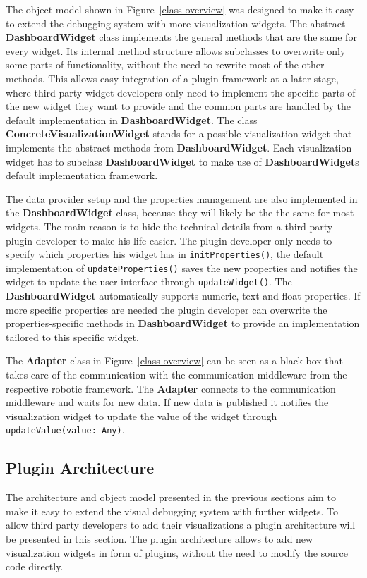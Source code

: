 The object model shown in Figure~\ref{class overview} was designed to make it easy to extend the debugging system with more visualization widgets. The abstract \textbf{DashboardWidget} class implements the general methods that are the same for every widget. Its internal method structure allows subclasses to overwrite only some parts of functionality, without the need to rewrite most of the other methods. This allows easy integration of a plugin framework at a later stage, where third party widget developers only need to implement the specific parts of the new widget they want to provide and the common parts are handled by the default implementation in \textbf{DashboardWidget}. The class \textbf{ConcreteVisualizationWidget} stands for a possible visualization widget that implements the abstract methods from \textbf{DashboardWidget}. Each visualization widget has to subclass \textbf{DashboardWidget} to make use of \textbf{DashboardWidget}s default implementation framework.

The data provider setup and the properties management are also implemented in the \textbf{DashboardWidget} class, because they will likely be the the same for most widgets. The main reason is to hide the technical details from a third party plugin developer to make his life easier. The plugin developer only needs to specify which properties his widget has in \verb+initProperties()+, the default implementation of \verb+updateProperties()+ saves the new properties and notifies the widget to update the user interface through \verb+updateWidget()+. The \textbf{DashboardWidget} automatically supports numeric, text and float properties. If more specific properties are needed the plugin developer can overwrite the properties-specific methods in \textbf{DashboardWidget} to provide an implementation tailored to this specific widget.

The \textbf{Adapter} class in Figure~\ref{class overview} can be seen as a black box that takes care of the communication with the communication middleware from the respective robotic framework. The \textbf{Adapter} connects to the communication middleware and waits for new data. If new data is published it notifies the visualization widget to update the value of the widget through \verb+updateValue(value: Any)+.


\subsection{Plugin Architecture}
\label{plugin_architecture_section}
The architecture and object model presented in the previous sections aim to make it easy to extend the visual debugging system with further widgets. To allow third party developers to add their visualizations a plugin architecture will be presented in this section. The plugin architecture allows to add new visualization widgets in form of plugins, without the need to modify the source code directly.

